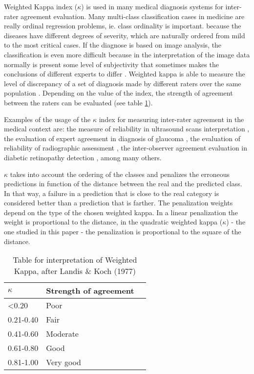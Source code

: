 Weighted Kappa index ($\kappa$) is used in many medical diagnosis systems for inter-rater agreement evaluation. Many multi-class classification cases in medicine are really ordinal regression problems, ie. class ordinality is important. because the diseases have different degrees of severity, which are naturally ordered from mild to the most critical cases. If the diagnose is based on image analysis, the classification is even more difficult because in the interpretation of the image data normally is present some level of subjectivity that sometimes makes the conclusions of different experts to differ \citep{hripcsak2002measuring}.
Weighted kappa is able to measure the level of discrepancy of a set of diagnosis made by different raters over the same population \citep{viera2005understanding}. Depending on the value of the index, the strength of agreement between the raters can be evaluated (see table \ref{tab:kappa_int}). 

Examples of the usage of the $\kappa$ index for measuring inter-rater agreement in the medical context are: the measure of reliability in ultrasound scans interpretation \citep{hintz2007interobserver}, the evaluation of expert agreement in diagnosis of glaucoma \citep{varma1992expert}, the evaluation of reliability of radiographic assessment \citep{gunther1999reliability}, the inter-observer agreement evaluation in diabetic retinopathy detection \citep{patra2009interobserver}, among many others. 

$\kappa$ takes into account the ordering of the classes and penalizes the erroneous predictions in function of the distance between the real and the predicted class. In that way, a failure in a prediction that is close to the real category is considered better than a prediction that is farther. The penalization weights depend on the type of the chosen weighted kappa. In a linear penalization the weight is proportional to the distance, in the quadratic weighted kappa ($\kappa$) - the one studied in this paper - the penalization is proportional to the square of the distance. %


\begin{table}
	\caption{\label{tab:kappa_int}Table for interpretation of Weighted Kappa, after Landis \& Koch (1977)}	
	\centering
	\begin{tabular}{llr}
		\hline
		$\kappa$    & Strength of agreement \\
		\hline
		<0.20 		& Poor \\
		0.21-0.40 	& Fair \\
		0.41-0.60 	& Moderate \\
		0.61-0.80 	& Good \\
		0.81-1.00 	& Very good \\
		\hline
	\end{tabular}
\end{table}
